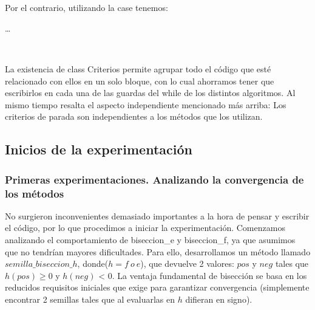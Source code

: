 ~


~

Por el contrario, utilizando la case tenemos:

\begin{algorithmic}
	\While{$!criterios.parar(parameters)$}
		\State \ldots
	\EndWhile
\end{algorithmic}

~

La existencia de class Criterios permite agrupar todo el código que esté relacionado con ellos en un solo bloque, con lo cual ahorramos tener que escribirlos
en cada una de las guardas del while de los distintos algoritmos. Al mismo tiempo resalta el aspecto independiente mencionado más arriba: Los criterios de parada son 
independientes a los métodos que los utilizan.


\subsection{Inicios de la experimentación}

\subsubsection{Primeras experimentaciones. Analizando la convergencia de los métodos}

No surgieron inconvenientes demasiado importantes a la hora de pensar y escribir el código, por lo que procedimos a iniciar la experimentación.
Comenzamos analizando el comportamiento de biseccion\_e y biseccion\_f, ya que asumimos que no tendrían mayores dificultades. Para ello, desarrollamos un método llamado
$semilla\_biseccion\_h$, donde($h = f \ o \ e$), que devuelve 2 valores: $pos$ y $neg$ tales que $h(pos)$ y $h(neg)$ < 0. La ventaja fundamental de bisección
se basa en los reducidos requisitos iniciales que exige para garantizar convergencia (simplemente encontrar 2 semillas tales que al evaluarlas en $h$ difieran en signo).










